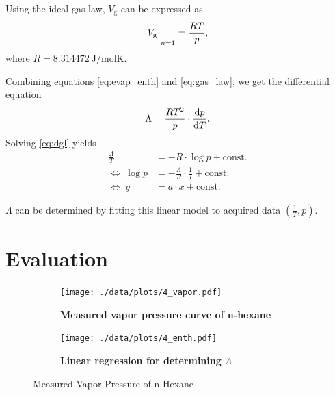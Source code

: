Using the ideal gas law, $V_\text{g}$ can be expressed as
\begin{equation}\label{eq:gas_law}
	V_\text{g}\at[\bigg]{n=1}=\frac{RT}{p},
\end{equation}
where $R=\SI{8.314472}{\joule\per\mole\kelvin}$.

Combining equations \ref{eq:evap_enth} and \ref{eq:gas_law}, we get the differential equation
\begin{equation}\label{eq:dgl}
	\Lambda=\frac{RT^2}{p}\cdot\frac{\d p}{\d T}.
\end{equation}
Solving \autoref{eq:dgl} yields
\begin{align}
	\frac{\Lambda}{T}&=-R\cdot\log{p}+\text{const.} \nonumber \\
	\Leftrightarrow\ \log{p}&=-\frac{\Lambda}{R}\cdot \frac{1}{T} + \text{const.}	\label{eq:fit_eq} \\
	\Leftrightarrow\ y&=a\cdot x + \text{const.} \nonumber
\end{align}

$\Lambda$ can be determined by fitting this linear model to acquired data $(\frac{1}{T},p)$.

\section{Evaluation}
\begin{figure}[tbp]
	\centering
	\begin{subfigure}{0.4\textwidth}
		\centering
		\texttt{[image: ./data/plots/4\_vapor.pdf]}
		\caption{\textbf{Measured vapor pressure curve of n-hexane}}
		\label{subfig:press_curve_meas}
	\end{subfigure}
	\begin{subfigure}{0.4\textwidth}
		\centering
		\texttt{[image: ./data/plots/4\_enth.pdf]}
		\caption{\textbf{Linear regression for determining $\Lambda$}}
		\label{subfig:lambda_meas}
	\end{subfigure}
	\caption{Measured Vapor Pressure of n-Hexane}
\end{figure}

